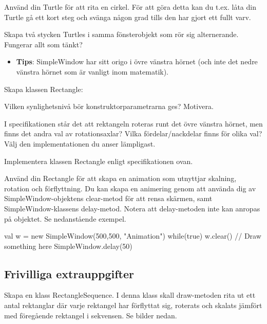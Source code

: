 \Subtask Använd din Turtle för att rita en cirkel. För att göra detta kan du t.ex. låta din Turtle gå ett kort steg och svänga någon grad tills den har gjort ett fullt varv.

\Subtask Skapa två stycken Turtles i samma fönsterobjekt som rör sig alternerande. Fungerar allt som tänkt?

\begin{itemize}
\item \textbf{Tips}: SimpleWindow har sitt origo i övre vänstra hörnet (och inte det nedre vänstra hörnet som är vanligt inom matematik).
\end{itemize}

\Task Skapa klassen Rectangle: 

\vspace{1em}%

\Subtask Vilken synlighetsnivå bör konstruktorparametrarna ges? Motivera.

\Subtask I specifikationen står det att rektangeln roteras runt det övre vänstra hörnet, men finns det andra val av rotationsaxlar? Vilka fördelar/nackdelar finns för olika val?
Välj den implementationen du anser lämpligast.

\Subtask Implementera klassen Rectangle enligt specifikationen ovan.

\Subtask Använd din Rectangle för att skapa en animation som utnyttjar skalning, rotation och förflyttning.
Du kan skapa en animering genom att använda dig av SimpleWindow-objektens clear-metod för att rensa skärmen, samt SimpleWindow-klassens delay-metod.
Notera att delay-metoden inte kan anropas på objektet. Se nedanstående exempel.

\begin{Code}
val w = new SimpleWindow(500,500, "Animation")
while(true){
	w.clear()
	// Draw something here
	SimpleWindow.delay(50)
}
\end{Code}


\clearpage

\subsection{Frivilliga extrauppgifter}


\Task Skapa en klass RectangleSequence. I denna klass skall draw-metoden rita ut ett antal rektanglar där varje rektangel har förflyttat sig, roterats och skalats jämfört med föregående rektangel i sekvensen. Se bilder nedan.


